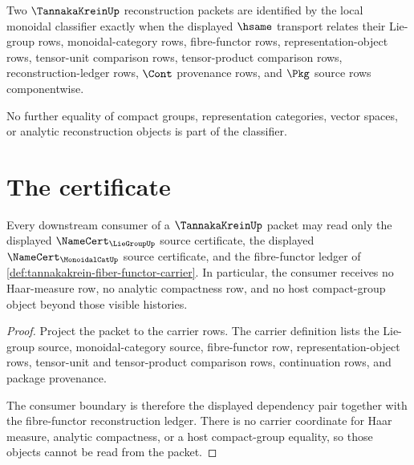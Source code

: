 \begin{definition}
\label{def:tannakakrein-monoidal-classifier}
Two $\TannakaKreinUp$ reconstruction packets are identified by the local
monoidal classifier exactly when the displayed $\hsame$ transport relates
their Lie-group rows, monoidal-category rows, fibre-functor rows,
representation-object rows, tensor-unit comparison rows, tensor-product
comparison rows, reconstruction-ledger rows, $\Cont$ provenance rows, and
$\Pkg$ source rows componentwise.

No further equality of compact groups, representation categories, vector
spaces, or analytic reconstruction objects is part of the classifier.
\end{definition}

\section{The certificate}
\label{sec:tannakakrein-certificate}

\begin{theorem}
\label{thm:tannakakrein-liegroup-monoidalcat-source-boundary}
Every downstream consumer of a $\TannakaKreinUp$ packet may read only the
displayed $\NameCert_{\LieGroupUp}$ source certificate, the displayed
$\NameCert_{\MonoidalCatUp}$ source certificate, and the fibre-functor ledger
of \autoref{def:tannakakrein-fiber-functor-carrier}. In particular, the
consumer receives no Haar-measure row, no analytic compactness row, and no
host compact-group object beyond those visible histories.
\end{theorem}
\begin{proof}
Project the packet to the carrier rows. The carrier definition lists the
Lie-group source, monoidal-category source, fibre-functor row,
representation-object rows, tensor-unit and tensor-product comparison rows,
continuation rows, and package provenance.

The consumer boundary is therefore the displayed dependency pair together
with the fibre-functor reconstruction ledger. There is no carrier coordinate
for Haar measure, analytic compactness, or a host compact-group equality, so
those objects cannot be read from the packet.
\end{proof}


